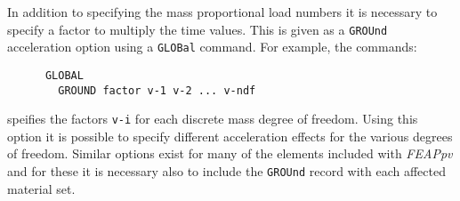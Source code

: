 In addition to specifying the mass proportional load numbers it is necessary
to specify a factor to multiply the time values.  This is given as a
{\tt GROUnd} acceleration option using a {\tt GLOBal} command.  For example,
the commands:
\begin{verbatim}
      GLOBAL
        GROUND factor v-1 v-2 ... v-ndf
\end{verbatim}
speifies the factors {\tt v-i} for each discrete mass degree of freedom.
Using this option it is possible to specify different acceleration effects
for the various degrees of freedom.  Similar options exist for many of the
elements included with {\sl FEAPpv} and for these it is necessary also to
include the {\tt GROUnd} record with each affected material set.
\vfil\eject
